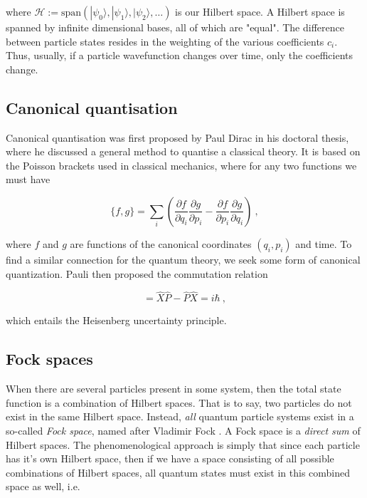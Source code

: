 \documentclass[10pt,twoside]{report}
\begin{document}
	\noindent where $\mathcal{H} := \text{span}(|\psi_0\rangle,|\psi_1\rangle,|\psi_2\rangle,\ldots)$ is our Hilbert space. A Hilbert space is spanned by infinite dimensional bases, all of which are "equal". The difference between particle states resides in the weighting of the various coefficients $c_i$. Thus, usually, if a particle wavefunction changes over time, only the coefficients change.
	
	\subsection{Canonical quantisation}
	Canonical quantisation was first proposed by Paul Dirac in his doctoral thesis, where he discussed a general method to quantise a classical theory. It is based on the Poisson brackets used in classical mechanics, where for any two functions we must have
	
	\begin{equation}
		\{f,g\} = \sum_{i} \left( \frac{\partial f}{\partial q_i}\frac{\partial g}{\partial p_i} - \frac{\partial f}{\partial p_i}\frac{\partial g}{\partial q_i} \right) \:,
	\end{equation}
	
	\noindent where $f$ and $g$ are functions of the canonical coordinates $(q_i,p_i)$ and time. To find a similar connection for the quantum theory, we seek some form of canonical quantization. Pauli then proposed the commutation relation
	
	\begin{equation}
		[\hat{X},\hat{P}] = \hat{X}\hat{P} - \hat{P}\hat{X} = i\hbar \:,
	\end{equation}
	
	\noindent which entails the Heisenberg uncertainty principle.
	
	\subsection{Fock spaces}
	When there are several particles present in some system, then the total state function is a combination of Hilbert spaces. That is to say, two particles do not exist in the same Hilbert space. Instead, \emph{all} quantum particle systems exist in a so-called \emph{Fock space}, named after Vladimir Fock \cite{ShavittBartlett09}. A Fock space is a \emph{direct sum} of Hilbert spaces. The phenomenological approach is simply that since each particle has it's own Hilbert space, then if we have a space consisting of all possible combinations of Hilbert spaces, all quantum states must exist in this combined space as well, i.e.
	
\end{document}
